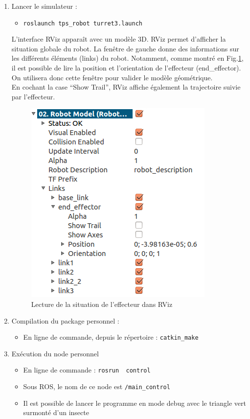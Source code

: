 \documentclass[12pt,a4paper]{article}
\begin{document}
  \begin{enumerate}
  
\item Lancer le simulateur : 
 \begin{itemize}
 \item \texttt{roslaunch tps\_robot turret3.launch}
 \end{itemize}
 L'interface RViz apparaît avec un modèle 3D.
RViz permet d'afficher la situation globale du robot. La fenêtre de gauche donne des informations sur les différents éléments (links) du robot.
Notamment, comme montré en Fig.\ref{fig:rviz}, il est possible de lire la position et l'orientation de l'effecteur (end\_effector). 
On utilisera donc cette fenêtre pour valider le modèle géométrique.\\
En cochant la case ``Show Trail'', RViz affiche également la trajectoire suivie par l'effecteur.

\begin{figure}[h]\centering
 \includegraphics[width=.3\linewidth]{rviz}
 \caption{Lecture de la situation de l'effecteur dans RViz}
 \label{fig:rviz}
\end{figure} 

  \item Compilation du package personnel : 
  \begin{itemize}
   \item En ligne de commande, depuis le répertoire \texttt{\ros}: \texttt{catkin\_make}
   \end{itemize}
     \item Exécution du node personnel
  \begin{itemize}
  \item En ligne de commande :  \texttt{rosrun \bin~control}
   \item Sous ROS, le nom de ce node est \texttt{/main\_control}
   \item Il est possible de lancer le programme en mode debug avec le triangle vert surmonté d'un insecte
  \end{itemize}
\end{enumerate}
\end{document}
